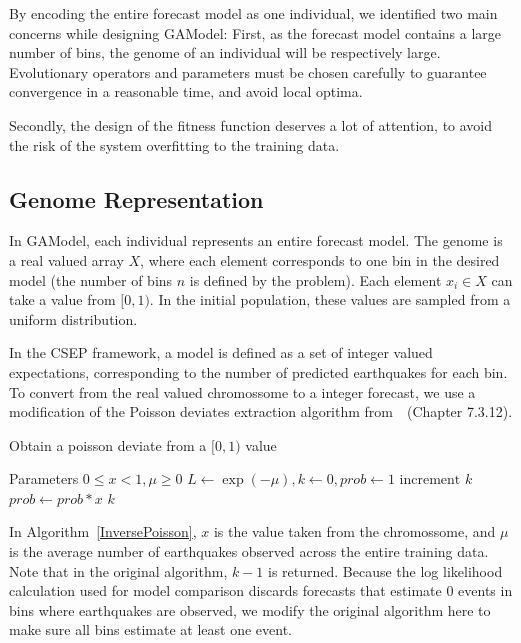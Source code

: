 \documentclass{sig-alternate}
\begin{document}
By encoding the entire forecast model as one individual, we identified
two main concerns while designing GAModel: First, as the forecast
model contains a large number of bins, the genome of an individual
will be respectively large. Evolutionary operators and parameters must
be chosen carefully to guarantee convergence in a reasonable time, and
avoid local optima.

Secondly, the design of the fitness function deserves a lot of
attention, to avoid the risk of the system overfitting to the training
data.

\subsection{Genome Representation}

In GAModel, each individual represents an entire forecast model. The
genome is a real valued array $X$, where each element corresponds to
one bin in the desired model (the number of bins $n$ is defined by the
problem). Each element $x_i \in X$ can take a value from $[0,1)$. In
  the initial population, these values are sampled from a uniform
  distribution.

In the CSEP framework, a model is defined as a set of integer valued
expectations, corresponding to the number of predicted earthquakes for
each bin. To convert from the real valued chromossome to a integer
forecast, we use a modification of the Poisson deviates extraction
algorithm from~\cite{NumericalRecipes}~(Chapter 7.3.12).

\begin{algorithm}
  \caption{Obtain a poisson deviate from a $[0,1)$ value}
  \label{InversePoisson}
  \begin{algorithmic}
    \STATE Parameters $0 \leq x < 1, \mu \geq 0$
    \STATE $L \gets \exp{(-\mu)}, k \gets 0, prob \gets 1$
    \REPEAT 
    \STATE $\text{increment }k$
    \STATE $prob \gets prob*x$
    \RETURN $k$
  \end{algorithmic}
\end{algorithm}

In Algorithm~\ref{InversePoisson}, $x$ is the value taken from the
chromossome, and $\mu$ is the average number of earthquakes observed
across the entire training data. Note that in the original algorithm,
$k-1$ is returned. Because the log likelihood calculation used for
model comparison discards forecasts that estimate $0$ events in bins
where earthquakes are observed, we modify the original algorithm here
to make sure all bins estimate at least one event.
\end{document}
